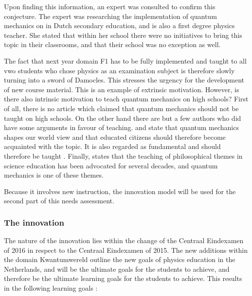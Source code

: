 \documentclass[11pt,twoside]{report} %
\begin{document}
Upon finding this information, an expert was consulted to confirm this conjecture. The expert was researching the implementation of quantum mechanics on in Dutch secondary education, and is also a first degree physics teacher. She stated that within her school there were no initiatives to bring this topic in their classrooms, and that their school was no exception as well.

The fact that next year domain F1 has to be fully implemented and taught to all vwo students who chose physics as an examination subject is therefore slowly turning into a sword of Damocles. This stresses the urgency for the development of new course material. This is an example of extrinsic motivation. However, is there also intrinsic motivation to teach quantum mechanics on high schools? First of all, there is no article which claimed that quantum mechanics should not be taught on high schools. On the other hand there are but a few authors who did have some arguments in favour of teaching.  and  state that quantum mechanics shapes our world view and that educated citizens should therefore become acquainted with the topic. It is also regarded as fundamental and should therefore be taught \cite{henriksen,hobson}. Finally,  states that the teaching of philosophical themes in science education has been advocated for several decades, and quantum mechanics is one of these themes.

Because it involves new instruction, the innovation model will be used for the second part of this needs assessment.

\subsubsection{The innovation}
\label{sssec:needsassessmentinnovation}

The nature of the innovation lies within the change of the Centraal Eindexamen of 2016 in respect to the Centraal Eindexamen of 2015. The new additions within the domain Kwantumwereld outline the new goals of physics education in the Netherlands, and will be the ultimate goals for the students to achieve, and therefore be the ultimate learning goals for the students to achieve. This results in the following learning goals \cite[p. 24-25]{eindexamen2016}:
\end{document}
